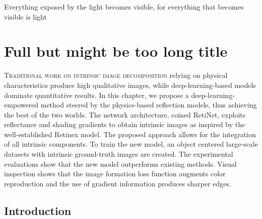 
\begin{savequote}[75mm]
Everything exposed by the light becomes visible, for everything that becomes visible is light
\end{savequote}


\chapter[short-title]{Full but might be too long title}

\lettrine[lines=3]{\textcolor{SchoolColor}{T}}{raditional work on intrinsic image
decomposition} relying on physical characteristics produce high qualitative images,
while deep-learning-based models dominate quantitative results.
In this chapter, we propose a deep-learning-empowered method steered by the
physics-based reflection models, thus achieving the best of the two worlds.
The network architecture, coined RetiNet, exploits reflectance and shading
gradients to obtain intrinsic images as inspired by the well-established
Retinex model. The proposed approach allows for the integration of all
intrinsic components. To train the new model, an object centered large-scale
datasets with intrinsic ground-truth images are created.
The experimental evaluations show that the new model outperforms existing
methods. Visual inspection shows that the image formation loss function augments
color reproduction and the use of gradient information produces sharper edges.

\section{Introduction}


